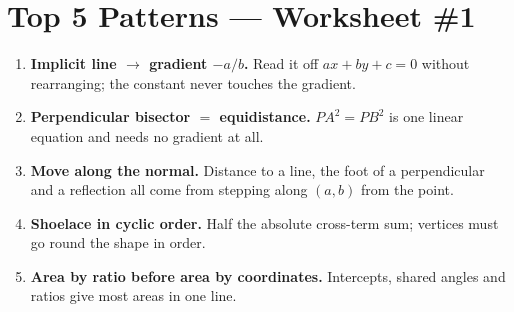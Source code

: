 \documentclass[11pt,a4paper]{article}
\begin{document}
\begin{enumerate}

\end{enumerate}

\section*{Top 5 Patterns --- Worksheet \#1}
\begin{enumerate}[leftmargin=2em,itemsep=4pt]
  \item \textbf{Implicit line $\rightarrow$ gradient $-a/b$.} Read it off $ax+by+c=0$ without rearranging; the constant never touches the gradient. 
  \item \textbf{Perpendicular bisector $=$ equidistance.} $PA^2=PB^2$ is one linear equation and needs no gradient at all. 
  \item \textbf{Move along the normal.} Distance to a line, the foot of a perpendicular and a reflection all come from stepping along $(a,b)$ from the point. 
  \item \textbf{Shoelace in cyclic order.} Half the absolute cross-term sum; vertices must go round the shape in order. 
  \item \textbf{Area by ratio before area by coordinates.} Intercepts, shared angles and ratios give most areas in one line. 
\end{enumerate}
\end{document}
